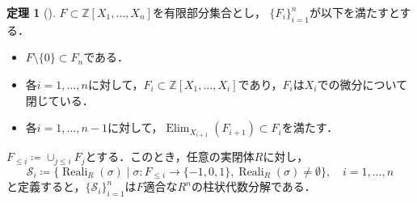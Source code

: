 \documentclass[uplatex, dvipdfmx]{jsarticle}
\numberwithin{equation}{section}
\newcommand{\Z}{\mathbb{Z}}
\newcommand{\map}[3]{{#1}\colon{#2}\rightarrow{#3}}
\DeclareMathOperator{\Elim}{Elim}
\DeclareMathOperator{\Reali}{Reali}
\theoremstyle{definition}
\newtheorem{theorem}[definition]{定理}
\begin{document}
\begin{theorem}[{\cite[Theorem 5.34]{MR2248869}}]\label{theorem:improved-cad}
     $F \subset \Z[X_1, \dots, X_n]$を有限部分集合とし，
     $\{F_i\}_{i=1}^n$が以下を満たすとする．
     \begin{itemize}
          \item $F \setminus \{0\} \subset F_n$である．\\
          \item 各$i=1,\dots, n$に対して，$F_i \subset \Z[X_1, \dots, X_i]$であり，$F_i$は$X_i$での微分について閉じている．\\
          \item 各$i=1, \dots, n-1$に対して，$\Elim_{X_{i+1}}(F_{i+1}) \subset F_i$を満たす．
     \end{itemize}

     $F_{\leq i}\coloneqq \cup_{j \leq i} F_j$とする．このとき，任意の実閉体$R$に対し，
     \begin{equation}
          \mathcal{S}_i \coloneqq \{\Reali_R(\sigma) \mid \map{\sigma}{F_{\leq i}}{\{-1,0,1\}}, \Reali_R(\sigma) \neq \emptyset\}, \quad i=1, \dots, n 
     \end{equation}          
     と定義すると，$\{\mathcal{S}_i\}_{i=1}^n$は$F$適合な$R^n$の柱状代数分解である．
\end{theorem}
\end{document}

